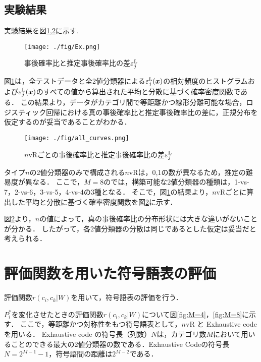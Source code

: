 \documentclass{jarticle}
\theoremstyle{definition}
\begin{document}
\subsection{実験結果}
実験結果を図\ref{fig:diff_true_prob},\ref{fig:diff_true_prob_nvR}に示す.
\begin{figure}[!t]
\begin{center}
\texttt{[image: ./fig/Ex.png]} 
\caption{事後確率比と推定事後確率比の差$\varepsilon^{\rm L}_j$}
\label{fig:diff_true_prob}
\end{center}
\end{figure}

図\ref{fig:diff_true_prob}は，全テストデータと全2値分類器による$\varepsilon^{\rm L}_j(\bm{x})$の相対頻度のヒストグラムおよび$\varepsilon^{\rm L}_j(\bm{x})$のすべての値から算出された平均と分散に基づく確率密度関数である．
この結果より，データがカテゴリ間で等距離かつ線形分離可能な場合，ロジスティック回帰における真の事後確率比と推定事後確率比の差に，正規分布を仮定するのが妥当であることがわかる．

\begin{figure}[!t]
\begin{center}
\texttt{[image: ./fig/all\_curves.png]} 
\caption{$n$vRごとの事後確率比と推定事後確率比の差$\varepsilon^{\rm L}_j$}
\label{fig:diff_true_prob_nvR}
\end{center}
\end{figure}


タイプ$n$の2値分類器のみで構成される$n$vRは，0,1の数が異なるため，推定の難易度が異なる．
ここで，$M = 8$のでは，構築可能な2値分類器の種類は，1-vs-7，2-vs-6，3-vs-5，4-vs-4の3種となる．
そこで，図\ref{fig:diff_true_prob}の結果より，$n$vRごとに算出した平均と分散に基づく確率密度関数を図\ref{fig:diff_true_prob_nvR}に示す．

図\ref{fig:diff_true_prob_nvR}より，$n$の値によって，真の事後確率比の分布形状には大きな違いがないことが分かる．
したがって，各2値分類器の分散は同じであるとした仮定は妥当だと考えられる．

\section{評価関数を用いた符号語表の評価}\label{sec:Eva_f}
評価関数$r(c_i,c_k|W)$を用いて，符号語表の評価を行う．

$P^*_i$を変化させたときの評価関数$r(c_i,c_k|W)$について図\ref{fig:M=4}，\ref{fig:M=8}に示す．
ここで，等距離かつ対称性をもつ符号語表として，$n$vR と Exhaustive code を用いる．
Exhaustive code の符号長（列数）$N$は，カテゴリ数$M$において用いることのできる最大の2値分類器の数である．Exhaustive Codeの符号長$N=2^{M-1} - 1$，符号語間の距離は$2^{M-2}$である．
\end{document}
